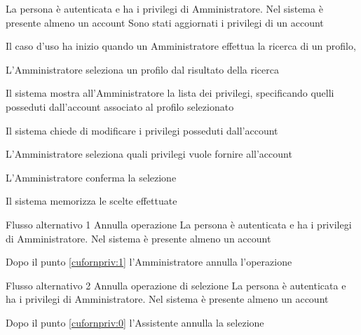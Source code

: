 {}
{La persona è autenticata e ha i privilegi di Amministratore. Nel sistema è presente almeno un account}
{Sono stati aggiornati i privilegi di un account}
{\begin{enumCU}
	\item Il caso d'uso ha inizio quando un Amministratore effettua la ricerca di un profilo, \label{cufornpriv:0}
	\item L'Amministratore seleziona un profilo dal risultato della ricerca
	\item Il sistema mostra all'Amministratore la lista dei privilegi, specificando quelli posseduti dall'account associato al profilo selezionato
	\item Il sistema chiede di modificare i privilegi posseduti dall'account
	\item L'Amministratore seleziona quali privilegi vuole fornire all'account\label{cufornpriv:1}
	\item L'Amministratore conferma la selezione
	\item Il sistema memorizza le scelte effettuate
\end{enumCU}}
%
{Flusso alternativo 1}%
{Annulla operazione}%
{La persona è autenticata e ha i privilegi di Amministratore. Nel sistema è presente almeno un account}%
{\postNulle}%
{\begin{enumCU}
		\item Dopo il punto \ref{cufornpriv:1} l'Amministratore annulla l'operazione
	\end{enumCU}}%
%	
{Flusso alternativo 2}%
{Annulla operazione di selezione}%
{La persona è autenticata e ha i privilegi di Amministratore. Nel sistema è presente almeno un account}%
{\postNulle}%
{\begin{enumCU}
		\item Dopo il punto \ref{cufornpriv:0} l'Assistente annulla la selezione
\end{enumCU}}%

\tabcuvspace

